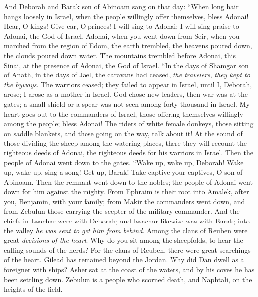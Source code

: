 \begin{biblechapter} %
 And Deborah and Barak son of Abinoam sang on that day:
\verse “When long hair hangs loosely in Israel, 
when the people willingly offer themselves, 
bless Adonai!
\verse Hear, O kings! Give ear, O princes! 
I will sing to Adonai; 
I will sing praise to Adonai, 
the God of Israel.
\verse Adonai, when you went down from Seir, 
when you marched from the region of Edom, 
the earth trembled, the heavens poured down, 
the clouds poured down water.
\verse The mountains trembled before Adonai, 
this Sinai, at the presence of Adonai, the God of Israel.
\verse “In the days of Shamgar son of Anath, 
in the days of Jael, the caravans had ceased, 
\textit{the travelers}, \textit{they kept to the byways}.
\verse The warriors ceased; 
they failed to appear in Israel, 
until I, Deborah, arose; 
I arose as a mother in Israel.
\verse God chose new leaders, 
then war was at the gates; 
a small shield or a spear was not seen 
among forty thousand in Israel.
\verse My heart goes out to the commanders of Israel, 
those offering themselves willingly among the people; 
bless Adonai!
\verse The riders of white female donkeys, 
those sitting on saddle blankets, 
and those going on the way, talk about it!
\verse At the sound of those dividing the sheep 
among the watering places, 
there they will recount the righteous deeds of Adonai, 
the righteous deeds for his warriors in Israel. 
Then the people of Adonai went down to the gates.
\verse “Wake up, wake up, Deborah! 
Wake up, wake up, sing a song! 
Get up, Barak! 
Take captive your captives, O son of Abinoam.
\verse Then the remnant went down to the nobles; 
the people of Adonai went down for him against the mighty.
\verse From Ephraim is their root into Amalek, 
after you, Benjamin, with your family; 
from Makir the commanders went down, 
and from Zebulun those carrying the scepter 
of the military commander.
\verse And the chiefs in Issachar were with Deborah; 
and Issachar likewise was with Barak; 
into the valley \textit{he was sent to get him from behind}. 
Among the clans of Reuben 
were great \textit{decisions of the heart}.
\verse Why do you sit among the sheepfolds, 
to hear the calling sounds of the herds? 
For the clans of Reuben, 
there were great searchings of the heart.
\verse Gilead has remained beyond the Jordan. 
Why did Dan dwell as a foreigner with ships? 
Asher sat at the coast of the waters, 
and by his coves he has been settling down.
\verse Zebulun is a people who scorned death, 
and Naphtali, on the heights of the field.

\end{biblechapter}
